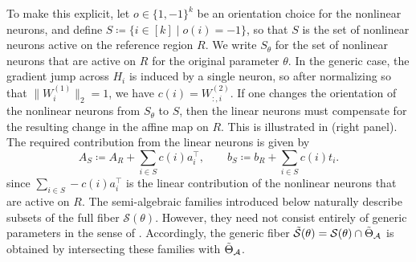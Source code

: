 \documentclass{article}
\theoremstyle{definition}
\newcommand{\architecture}{\mathcal{A}}
\newcommand{\gparamspace}[1]{\Tilde{\Theta}_{#1}}
\newcommand{\weights}[1]{W^{(#1)}}
\newcommand{\fiber}[1]{\mathcal{S}({#1})}
\newcommand{\gfiber}[1]{\Tilde{\mathcal{S}}({#1})}
\begin{document}
To make this explicit, let $o\in\{1,-1\}^k$ be an orientation choice for the nonlinear neurons, and define
$S \coloneqq \{i\in[k]\mid o(i)=-1\}$, 
so that $S$ is the set of nonlinear neurons active on the reference region $R$. We write $S_\theta$ for the set of nonlinear neurons that are active on $R$ for the original parameter $\theta$. In the generic case, the gradient jump across $H_i$ is induced by a single neuron, so after normalizing so that $\|\weights{1}_i\|_2=1$, we have
$c(i)=\weights{2}_{:,i}$. 
If one changes the orientation of the nonlinear neurons from $S_\theta$ to $S$, then the linear neurons must compensate for the resulting change in the affine map on $R$. This is illustrated in  (right panel). The required contribution from the linear neurons is given by 
\begin{equation}
\label{eq:generic_compensation}
    A_S \coloneqq A_R + \sum_{i \in S} c(i) a_i^\top,
    \qquad
    b_S \coloneqq b_R + \sum_{i \in S} c(i) t_i.
\end{equation}
since $\sum_{i \in S} -c(i)a_i^\top$ is the linear contribution of the nonlinear neurons that are active on $R$.
The semi-algebraic families introduced below naturally describe subsets of the full fiber $\fiber{\theta}$. However, they need not consist entirely of generic parameters in the sense of . Accordingly, the generic fiber
$
\gfiber{\theta}=\fiber{\theta}\cap \gparamspace{\architecture}
$
is obtained by intersecting these families with $\gparamspace{\architecture}$. 
%
\end{document}
